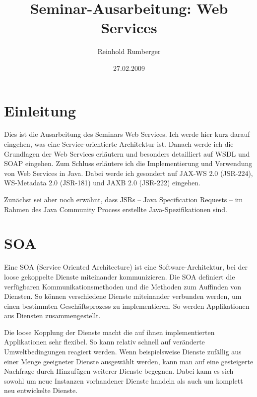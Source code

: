 \documentclass[runningheads]{llncs}
\author{Reinhold Rumberger}
\institute{Institute of Architecture of Application Systems (IAAS)
  \email{rumberrd@studi.informatik.uni-stuttgart.de}}
\title{Seminar-Ausarbeitung: Web Services}
\date{27.02.2009}
\begin{document}
  \frontmatter
  \pagestyle{headings}

  \maketitle
  \tableofcontents
  \mainmatter

  \section{Einleitung}
    Dies ist die Ausarbeitung des Seminars \glqq{}Web Services\grqq{}. Ich werde hier kurz darauf eingehen, was eine Service-orientierte Architektur ist. Danach werde ich die Grundlagen der Web Services erläutern und besonders detailliert auf WSDL und SOAP eingehen. Zum Schluss erläutere ich die Implementierung und Verwendung von Web Services in Java. Dabei werde ich gesondert auf JAX-WS 2.0 (JSR-224), WS-Metadata 2.0 (JSR-181) und JAXB 2.0 (JSR-222) eingehen.

    Zunächst sei aber noch erwähnt, dass \glqq{}JSRs\grqq{} -- Java Specification Requests -- im Rahmen des Java Community Process erstellte Java-Spezifikationen sind.


  \section{SOA}
  \nocite{wk_soa}
    Eine \glqq{}SOA\grqq{} (Service Oriented Architecture) ist eine Software-Architektur, bei der loose gekoppelte Dienste miteinander kommunizieren. Die SOA definiert die verfügbaren Kommunikationsmethoden und die Methoden zum Auffinden von Diensten. So können verschiedene Dienste miteinander verbunden werden, um einen bestimmten Geschäftsprozess zu implementieren. So werden Applikationen aus Diensten zusammengestellt.

    Die loose Kopplung der Dienste macht die auf ihnen implementierten Applikationen sehr flexibel. So kann relativ schnell auf veränderte Umweltbedingungen reagiert werden. Wenn beispielsweise Dienste zufällig aus einer Menge geeigneter Dienste ausgewählt werden, kann man auf eine gesteigerte Nachfrage durch Hinzufügen weiterer Dienste begegnen. Dabei kann es sich sowohl um neue Instanzen vorhandener Dienste handeln als auch um komplett neu entwickelte Dienste.


\end{document}

